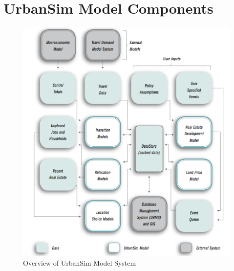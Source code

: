 



\section{UrbanSim Model Components}


\begin{figure}[htp]
\center
 \includegraphics[width=6.5in]
 {graphics/urbansim-overview.png}
\caption{Overview of UrbanSim Model System}
\label{fig:urbansim-overview}
\end{figure}

